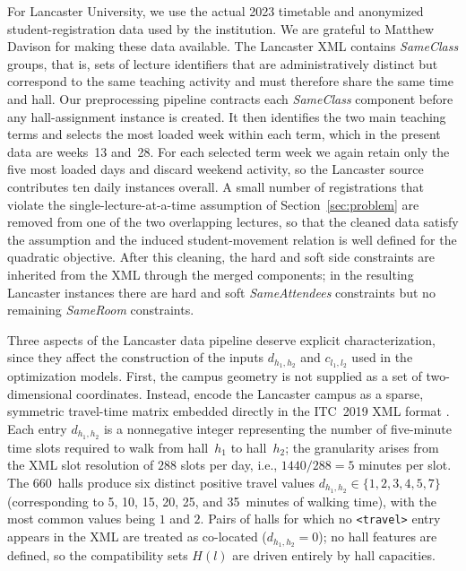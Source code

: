 \documentclass[11pt]{article}
\begin{document}
For Lancaster University, we use the actual 2023 timetable and anonymized student-registration data used by the institution. We are grateful to Matthew Davison for making these data available. The Lancaster XML contains \emph{SameClass} groups, that is, sets of lecture identifiers that are administratively distinct but correspond to the same teaching activity and must therefore share the same time and hall. Our preprocessing pipeline contracts each \emph{SameClass} component before any hall-assignment instance is created. It then identifies the two main teaching terms and selects the most loaded week within each term, which in the present data are weeks~13 and~28. For each selected term week we again retain only the five most loaded days and discard weekend activity, so the Lancaster source contributes ten daily instances overall. A small number of registrations that violate the single-lecture-at-a-time assumption of Section~\ref{sec:problem} are removed from one of the two overlapping lectures, so that the cleaned data satisfy the assumption and the induced student-movement relation is well defined for the quadratic objective. After this cleaning, the hard and soft side constraints are inherited from the XML through the merged components; in the resulting Lancaster instances there are hard and soft \emph{SameAttendees} constraints but no remaining \emph{SameRoom} constraints.

Three aspects of the Lancaster data pipeline deserve explicit characterization, since they affect the construction of the inputs $d_{h_1,h_2}$ and $c_{l_1,l_2}$ used in the optimization models. First, the campus geometry is not supplied as a set of two-dimensional coordinates. Instead, \citet{davison2025} encode the Lancaster campus as a sparse, symmetric travel-time matrix embedded directly in the ITC~2019 XML format \citep{muller2025itc2019}. Each entry $d_{h_1,h_2}$ is a nonnegative integer representing the number of five-minute time slots required to walk from hall~$h_1$ to hall~$h_2$; the granularity arises from the XML slot resolution of $288$ slots per day, i.e., $1440/288=5$ minutes per slot. The 660~halls produce six distinct positive travel values $d_{h_1,h_2} \in \{1,2,3,4,5,7\}$ (corresponding to 5, 10, 15, 20, 25, and 35~minutes of walking time), with the most common values being $1$ and $2$. Pairs of halls for which no \texttt{<travel>} entry appears in the XML are treated as co-located ($d_{h_1,h_2}=0$); no hall features are defined, so the compatibility sets $H(l)$ are driven entirely by hall capacities.
\end{document}
